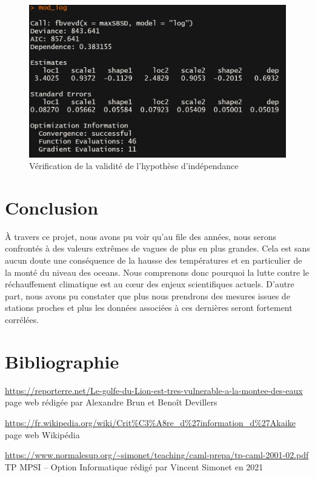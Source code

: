 \documentclass[a4paper,french,10pt]{article}
\begin{document}
\begin{figure}[htp] 
	\centering
	\includegraphics[scale=0.45]{images/dependance_log3.png}
	\caption{Vérification de la validité de l'hypothèse d'indépendance}
	\label{dependance_log3}
\end{figure}

\newpage

\section{Conclusion}
À travers ce projet, nous avons pu voir qu'au file des années, nous serons confrontés à des valeurs extrêmes de vagues de plus en plus grandes. Cela est sans aucun doute une conséquence de la hausse des températures et en particulier de la monté du niveau des oceans. Nous comprenons donc pourquoi la lutte contre le réchauffement climatique est au cœur des enjeux scientifiques actuels. D'autre part, nous avons pu constater que plus nous prendrons des mesures issues de stations proches et plus les données associées à ces dernières seront fortement corrélées. 


\newpage

\section{Bibliographie}

\renewcommand\refname{}
\begin{thebibliography}{9}
	\url{https://reporterre.net/Le-golfe-du-Lion-est-tres-vulnerable-a-la-montee-des-eaux}
	page web rédigée par Alexandre Brun et Benoît Devillers
	
	\url{https://fr.wikipedia.org/wiki/Crit%C3%A8re_d%27information_d%27Akaike}
	page web Wikipédia
	
	\url{https://www.normalesup.org/~simonet/teaching/caml-prepa/tp-caml-2001-02.pdf}
	TP MPSI – Option Informatique rédigé par Vincent Simonet en 2021
\end{thebibliography}

%
\end{document}
